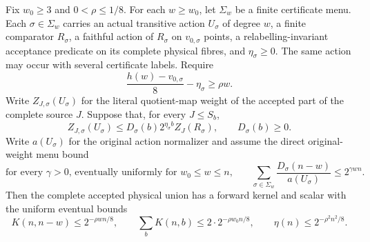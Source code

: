 \begin{theorem}\label{thm:parametric}
Fix $w_0\geq3$ and $0<\rho\leq1/8$.
For each $w\geq w_0$, let $\Sigma_w$ be a finite certificate menu.
Each $\sigma\in\Sigma_w$ carries an actual transitive action $U_\sigma$
of degree $w$, a finite comparator $R_\sigma$, a faithful action of
$R_\sigma$ on $v_{0,\sigma}$ points, a relabelling-invariant acceptance
predicate on its complete physical fibres, and $\eta_\sigma\geq0$.
The same action may occur with several certificate labels. Require
\[
 \frac{h(w)-v_{0,\sigma}}{8}-\eta_\sigma\geq\rho w.
\]
Write $Z_{J,\sigma}(U_\sigma)$ for the literal quotient-map weight of
the accepted part of the complete source $J$. Suppose that, for every
$J\leq S_b$,
\begin{equation}\label{eq:parametric-fibre}
 Z_{J,\sigma}(U_\sigma)\leq
 D_\sigma(b)2^{\eta_\sigma b}Z_J(R_\sigma),
 \qquad D_\sigma(b)\geq0.
\end{equation}
Write $a(U_\sigma)$ for the original action normalizer and assume the direct
original-weight menu bound
\begin{equation}\label{eq:parametric-menu-mass}
 \text{for every $\gamma>0$, eventually uniformly for $w_0\leq w\leq n$,}
 \qquad
 \sum_{\sigma\in\Sigma_w}
       \frac{D_\sigma(n-w)}{a(U_\sigma)}\leq2^{\gamma wn}.
\end{equation}
Then the complete accepted physical union has a forward kernel and scalar
with the uniform eventual bounds
\begin{equation}\label{eq:parametric-rates}
 K(n,n-w)\leq2^{-\rho wn/8},\qquad
 \sum_bK(n,b)\leq2\cdot2^{-\rho w_0n/8},\qquad
 \eta(n)\leq2^{-\rho^2n^2/8}.
\end{equation}
\end{theorem}

